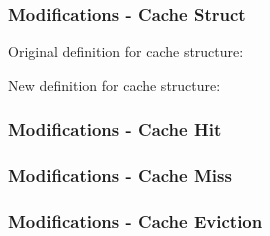 \documentclass{beamer}
\begin{document}
\begin{frame}
  \frametitle{Modifications - Cache Struct}

  Original definition for cache structure:
  \begin{adjustbox}{width=\textwidth,keepaspectratio}
    
  \end{adjustbox}

  \vspace{\baselineskip}

  New definition for cache structure:
  \begin{adjustbox}{width=\textwidth,keepaspectratio}
    
  \end{adjustbox}

\end{frame}

\begin{frame}
  \frametitle{Modifications - Cache Hit}

  \begin{adjustbox}{width=\textwidth,keepaspectratio}
    
  \end{adjustbox}

\end{frame}

\begin{frame}
  \frametitle{Modifications - Cache Miss}

  \begin{adjustbox}{width=\textwidth,keepaspectratio}
    
  \end{adjustbox}

\end{frame}

\begin{frame}
  \frametitle{Modifications - Cache Eviction}

  \begin{adjustbox}{width=\textwidth,keepaspectratio}
    
  \end{adjustbox}

\end{frame}
\end{document}
